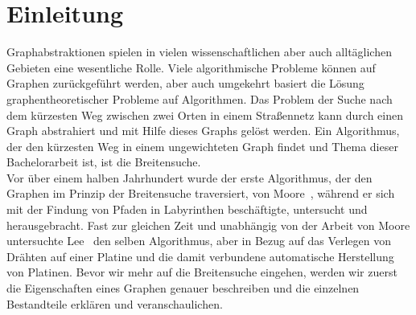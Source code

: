 \documentclass[11pt,a4paper]{article}
\begin{document}
\section{Einleitung}
\label{sec:einleitung}
Graphabstraktionen spielen in vielen wissenschaftlichen aber auch alltäglichen Gebieten eine wesentliche Rolle. Viele algorithmische Probleme können auf Graphen zurückgeführt werden, aber auch umgekehrt basiert die Lösung graphentheoretischer Probleme auf Algorithmen. Das Problem der Suche nach dem kürzesten Weg zwischen zwei Orten in einem Straßennetz kann durch einen Graph abstrahiert und mit Hilfe dieses Graphs gelöst werden. Ein Algorithmus, der den kürzesten Weg in einem ungewichteten Graph findet und Thema dieser Bachelorarbeit ist, ist die Breitensuche.\\
Vor über einem halben Jahrhundert wurde der erste Algorithmus, der den Graphen im Prinzip der Breitensuche traversiert, von Moore~\cite{moore}, während er sich mit der Findung von Pfaden in Labyrinthen beschäftigte, untersucht und herausgebracht. Fast zur gleichen Zeit und unabhängig von der Arbeit von Moore untersuchte Lee~\cite{lee} den selben Algorithmus, aber in Bezug auf das Verlegen von Drähten auf einer Platine und die damit verbundene automatische Herstellung von Platinen. Bevor wir mehr auf die Breitensuche eingehen, werden wir zuerst die Eigenschaften eines Graphen genauer beschreiben und die einzelnen Bestandteile erklären und veranschaulichen.
\end{document}

